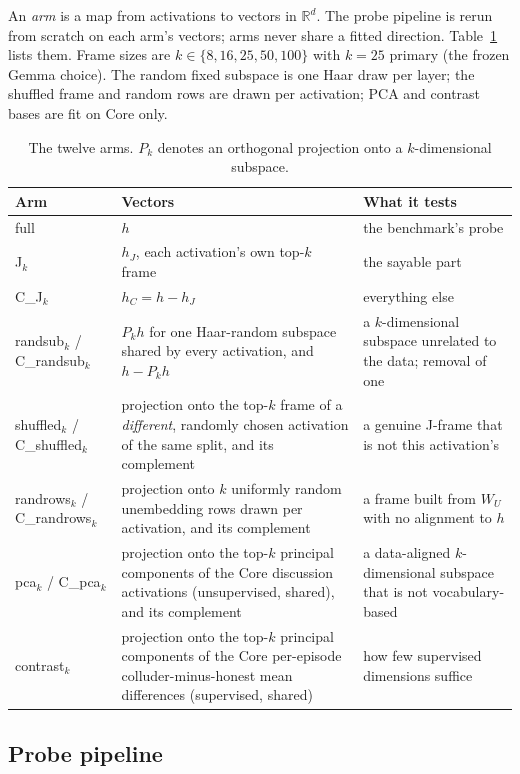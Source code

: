 \documentclass[11pt,a4paper]{article}
\newcommand{\WU}{W_U}
\newcommand{\hJ}{h_J}
\newcommand{\hC}{h_C}
\begin{document}
An \emph{arm} is a map from activations to vectors in $\mathbb{R}^d$. The probe pipeline is rerun from scratch on each arm's vectors; arms never share a fitted direction. Table~\ref{tab:arms} lists them. Frame sizes are $k\in\{8,16,25,50,100\}$ with $k=25$ primary (the frozen Gemma choice). The random fixed subspace is one Haar draw per layer; the shuffled frame and random rows are drawn per activation; PCA and contrast bases are fit on Core only.

\begin{table}[t]
\centering
\caption{The twelve arms. $P_k$ denotes an orthogonal projection onto a $k$-dimensional subspace.}
\label{tab:arms}
\small
\begin{tabularx}{\textwidth}{@{}l>{\raggedright\arraybackslash}X>{\raggedright\arraybackslash}X@{}}
\toprule
\textbf{Arm} & \textbf{Vectors} & \textbf{What it tests} \\
\midrule
full & $h$ & the benchmark's probe \\
J$_k$ & $\hJ$, each activation's own top-$k$ frame & the sayable part \\
C\_J$_k$ & $\hC = h-\hJ$ & everything else \\
randsub$_k$ / C\_randsub$_k$ & $P_k h$ for one Haar-random subspace shared by every activation, and $h-P_kh$ & a $k$-dimensional subspace unrelated to the data; removal of one \\
shuffled$_k$ / C\_shuffled$_k$ & projection onto the top-$k$ frame of a \emph{different}, randomly chosen activation of the same split, and its complement & a genuine J-frame that is not this activation's \\
randrows$_k$ / C\_randrows$_k$ & projection onto $k$ uniformly random unembedding rows drawn per activation, and its complement & a frame built from $\WU$ with no alignment to $h$ \\
pca$_k$ / C\_pca$_k$ & projection onto the top-$k$ principal components of the Core discussion activations (unsupervised, shared), and its complement & a data-aligned $k$-dimensional subspace that is not vocabulary-based \\
contrast$_k$ & projection onto the top-$k$ principal components of the Core per-episode colluder-minus-honest mean differences (supervised, shared) & how few supervised dimensions suffice \\
\bottomrule
\end{tabularx}
\end{table}

\subsection{Probe pipeline}
\end{document}
